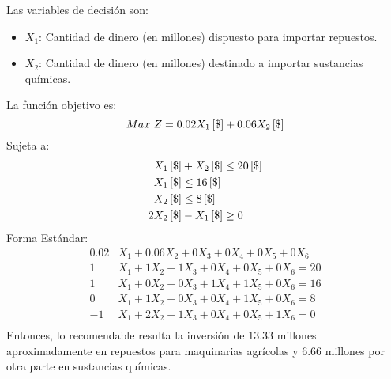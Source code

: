 \documentclass{tarea}
\begin{document}
\begin{homeworkProblem}[-1][Importador]
Las variables de decisión son:
\begin{itemize}
	\item $X_1$: Cantidad de dinero (en millones) dispuesto para importar repuestos.
	\item $X_2$: Cantidad de dinero (en millones) destinado a importar sustancias químicas.
\end{itemize}
La función objetivo es: 
\begin{equation}
	Max\ Z = 0.02X_1\left[ \$ \right] + 0.06X_2\left[ \$ \right]
\end{equation}
Sujeta a:
\begin{align*}
	&X_1\left[ \$ \right] + X_2\left[ \$ \right] \le 20\left[ \$ \right] \\
	&X_1\left[ \$ \right] \le 16\left[ \$ \right] \\
	&X_2\left[ \$ \right] \le 8 \left[ \$ \right] \\
	2&X_2\left[ \$ \right] - X_1\left[ \$ \right] \ge 0
\end{align*}
Forma Estándar:
\begin{align*}
0.02&X_1 + 0.06X_2 + 0X_3 + 0X_4 + 0X_5 + 0X_6 \\
1&X_1 + 1X_2 + 1X_3 + 0X_4 + 0X_5 + 0X_6 = 20 \\
1&X_1 + 0X_2 + 0X_3 + 1X_4 + 1X_5 + 0X_6 = 16 \\
0&X_1 + 1X_2 + 0X_3 + 0X_4 + 1X_5 + 0X_6 = 8\\
-1&X_1 + 2X_2 + 1X_3 + 0X_4 + 0X_5 + 1X_6 = 0  \\
\end{align*}
Entonces, lo recomendable resulta la inversión de $13.33$ millones aproximadamente en repuestos para maquinarias agrícolas y $6.66$ millones por otra parte en sustancias químicas.
\end{homeworkProblem}
\end{document}
